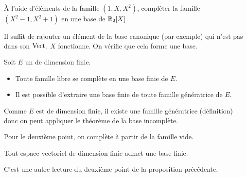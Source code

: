\documentclass{magnolia}
\begin{document}
\begin{exoUnique}
\exo \`A l'aide d'éléments de la famille $(1, X, X^2)$, compléter la famille
  $(X^2-1,X^2+1)$ en une base de $\polyR[2]$.
\begin{sol}
Il suffit de rajouter un élément de la base canonique (par exemple) qui n'est pas dans son $\operatorname{Vect}$. $X$ fonctionne. On vérifie que cela forme une base.
\end{sol}
\end{exoUnique}



\begin{theoreme}[nom={Théorèmes de la base incomplète et de la base extraite}]
Soit $E$ un \Kev de dimension finie.
\begin{itemize}
\item Toute famille libre se complète en une base finie de $E$.
\item Il est possible d'extraire une base finie de toute famille génératrice de $E$.
\end{itemize}
\end{theoreme}

\begin{preuve}
Comme $E$ est de dimension finie, il existe une famille génératrice (définition) donc on peut appliquer le théorème de la base incomplète.

Pour le deuxième point, on complète à partir de la famille vide.
\end{preuve}



\begin{proposition}[utile=-3]
Tout espace vectoriel de dimension finie admet une base finie.
\end{proposition}

\begin{preuve}
C'est une autre lecture du deuxième point de la proposition précédente.
\end{preuve}
\end{document}
